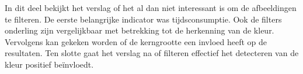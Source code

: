 In dit deel bekijkt het verslag of het al dan niet interessant is om de afbeeldingen te filteren. De eerste belangrijke indicator was tijdsconsumptie. Ook de filters onderling zijn vergelijkbaar met betrekking tot de herkenning van de kleur. Vervolgens kan gekeken worden of de kerngrootte een invloed heeft op de resultaten. Ten slotte gaat het verslag na of filteren effectief het detecteren van de kleur positief beïnvloedt. 